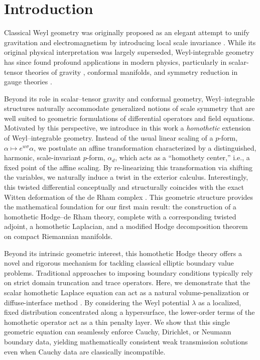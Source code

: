 \documentclass[preprint,12pt]{elsarticle}
\theoremstyle{plain}
\theoremstyle{definition}
\theoremstyle{note}
\begin{document}
\section{Introduction}\label{sec:intro}

Classical Weyl geometry was originally proposed as an elegant attempt to unify gravitation and electromagnetism by introducing local scale invariance \cite{Weyl1918}. While its original physical interpretation was largely superseded, Weyl-integrable geometry has since found profound applications in modern physics, particularly in scalar-tensor theories of gravity \cite{RomeroFonsecaNetoPucheu2012}, conformal manifolds, and symmetry reduction in gauge theories \cite{KarananasMonin2016, Sabetghadam2025}.

Beyond its role in scalar–tensor gravity and conformal geometry,
Weyl–integrable structures naturally accommodate generalized notions of scale symmetry
that are well suited to geometric formulations of differential operators and field
equations. Motivated by this perspective, we introduce in this work a \emph{homothetic} extension
of Weyl–integrable geometry. Instead of the usual linear scaling of a $p$-form, $\alpha \mapsto e^{w\sigma}\alpha$, we postulate an affine transformation characterized by a distinguished, harmonic, scale-invariant $p$-form, $\alpha_d$, which acts as a ``homothety center,'' i.e., a fixed point of the affine scaling. By re-linearizing this transformation via shifting the  variables, we naturally induce a twist in the exterior calculus. Interestingly, this twisted differential conceptually and structurally coincides with the exact Witten deformation of the de Rham complex \cite{Witten1982, Roe1998}. This geometric structure provides the mathematical foundation for our first main result: the construction of a homothetic Hodge--de Rham theory, complete with a corresponding twisted adjoint, a homothetic Laplacian, and a modified Hodge decomposition theorem on compact Riemannian manifolds.

Beyond its intrinsic geometric interest, this homothetic Hodge theory offers a novel and rigorous mechanism for tackling classical elliptic boundary value problems. Traditional approaches to imposing boundary conditions typically rely on strict domain truncation and trace operators. Here, we demonstrate that the scalar homothetic Laplace equation can act as a natural volume-penalization or diffuse-interface method \cite{Mittal2008}. By considering the Weyl potential $\lambda$ as a localized, fixed distribution concentrated along a hypersurface, the lower-order terms of the homothetic operator act as a thin penalty layer. We show that this single geometric equation can seamlessly enforce Cauchy, Dirichlet, or Neumann boundary data, yielding mathematically consistent weak transmission solutions even when Cauchy data are classically incompatible.
\end{document}
